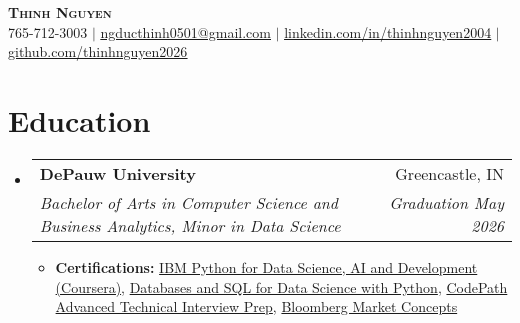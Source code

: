 \documentclass[letterpaper,11pt]{article}
\makeatletter
\newcommand{\resumeSubheading}[4]{
  \vspace{-2pt}\item
    \begin{tabular*}{0.97\textwidth}[t]{l@{\extracolsep{\fill}}r}
      \textbf{#1} & #2 \\
      \textit{\small#3} & \textit{\small #4} \\
    \end{tabular*}\vspace{-7pt}
}
\newcommand{\resumeSubHeadingListStart}{\begin{itemize}[leftmargin=0.15in, label={}]}
\newcommand{\resumeSubHeadingListEnd}{\end{itemize}}
\makeatother
\begin{document}

\begin{center}
    \textbf{\Huge \scshape Thinh Nguyen} \\ \vspace{1pt}
    \small 765-712-3003 $|$ \href{mailto:ngducthinh0501@gmail.com}{\underline{ngducthinh0501@gmail.com}} $|$ 
    \href{https://linkedin.com/in/thinhnguyen2004}{\underline{linkedin.com/in/thinhnguyen2004}} $|$
    \href{https://github.com/thinhnguyen2026}{\underline{github.com/thinhnguyen2026}}
\end{center}


\section{Education}
  \resumeSubHeadingListStart
    \resumeSubheading
      {DePauw University}{Greencastle, IN}
      {Bachelor of Arts in Computer Science and Business Analytics, Minor in Data Science}{Graduation May 2026}    
        \begin{itemize}
            \item {\textbf{Certifications:} \href{https://drive.google.com/file/d/1dv8l6AnSZnbZ3kfPi0Ll2GWzgBpl-BIZ/view}{IBM Python for Data Science, AI and Development (Coursera)}, \href{https://drive.google.com/file/d/1d4jQ586cXonD85_TsIsrkie5M4O631eL/view?usp=sharing}{Databases and SQL for Data Science with Python}, \href{https://drive.google.com/file/d/1qO17zJczFdyqvD-n1KdpH_S2pjaCYBN7/view}{CodePath Advanced Technical Interview Prep},
            \href{https://drive.google.com/file/d/1KFJwFd-aVbnMlLmq5R7Pd7LqcZL8-T7N/view}{Bloomberg Market Concepts}}
        \end{itemize}
  \resumeSubHeadingListEnd







\end{document}
